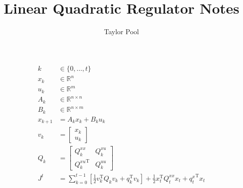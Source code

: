 \documentclass{article}
\begin{document}
\title{Linear Quadratic Regulator Notes}
\author{Taylor Pool}

\maketitle

\begin{align*}
	k       & \in \{ 0, \ldots, t \}                                                                                                                                       \\
	x_k     & \in \mathbb{R}^n                                                                                                                                             \\
	u_k     & \in \mathbb{R}^m                                                                                                                                             \\
	A_k     & \in \mathbb{R}^{n \times n}                                                                                                                                  \\
	B_k     & \in \mathbb{R}^{n \times m}                                                                                                                                  \\
	x_{k+1} & = A_k x_k + B_k u_k                                                                                                                                          \\
	v_k     & = \begin{bmatrix}
		            x_k \\
		            u_k
	            \end{bmatrix}                                                                                                                                             \\
	Q_k     & = \begin{bmatrix}
		            Q_k^{xx}              & Q_k^{xu} \\
		            {Q_k^{xu}}^\mathrm{T} & Q_k^{uu}
	            \end{bmatrix}                                                                                                                           \\
	J^t     & = \sum_{k=0}^{t-1} \left[ \frac{1}{2} v_k^\mathrm{T} Q_k v_k + q_k^\mathrm{T} v_k \right] + \frac{1}{2} x_t^\mathrm{T} Q_t^{xx} x_t + {q_t^x}^\mathrm{T} x_t
\end{align*}
\end{document}
